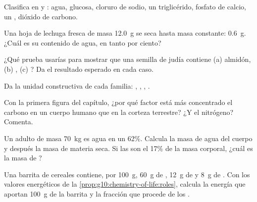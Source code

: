 \begin{exercise}[$\star$]\label{exo:g10:chemistry-of-life:2}
Clasifica en  y : agua, glucosa, cloruro
de sodio, un triglicérido, fosfato de calcio, un , dióxido de
carbono.
\end{exercise}

\begin{exercise}[$\star$]\label{exo:g10:chemistry-of-life:3}
Una hoja de lechuga fresca de masa \qty{12.0}{g} se seca hasta masa
constante: \qty{0.6}{g}. ¿Cuál es su contenido de agua, en tanto por ciento?
\end{exercise}

\begin{exercise}[$\star$]\label{exo:g10:chemistry-of-life:4}
¿Qué prueba usarías para mostrar que una semilla de judía contiene
(a) almidón, (b) , (c) ? Da el resultado esperado en cada caso.
\end{exercise}

\begin{exercise}[$\star$]\label{exo:g10:chemistry-of-life:5}
Da la unidad constructiva de cada familia: , ,
, .
\end{exercise}

\begin{exercise}[$\star\star$]\label{exo:g10:chemistry-of-life:6}
Con la primera figura del capítulo, ¿por qué factor está más
concentrado el carbono en un cuerpo humano que en la corteza terrestre?
¿Y el nitrógeno? Comenta.
\end{exercise}

\begin{exercise}[$\star\star$]\label{exo:g10:chemistry-of-life:7}
Un adulto de masa \qty{70}{kg} es agua en un 62\%. Calcula la masa de
agua del cuerpo y después la masa de materia seca. Si las  son
el 17\% de la masa corporal, ¿cuál es la masa de ?
\end{exercise}

\begin{exercise}[$\star\star$]\label{exo:g10:chemistry-of-life:8}
Una barrita de cereales contiene, por \qty{100}{g}, \qty{60}{g} de
, \qty{12}{g} de  y \qty{8}{g} de . Con los
valores energéticos de la \cref{prop:g10:chemistry-of-life:roles},
calcula la energía que aportan \qty{100}{g} de la barrita y la fracción
que procede de los .
\end{exercise}

